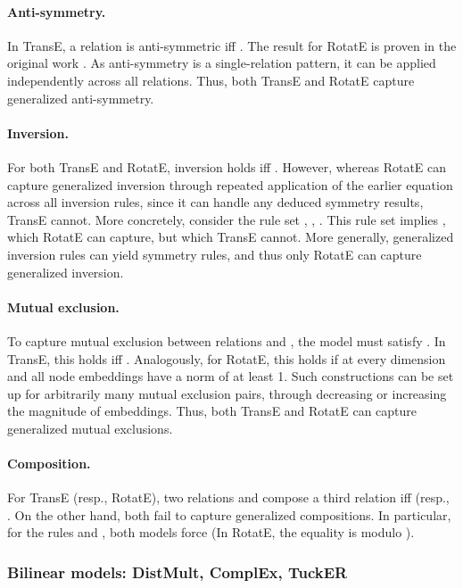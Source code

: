 \documentclass{article}
\begin{document}
\paragraph{Anti-symmetry.} In TransE, a relation  is anti-symmetric iff . The result for RotatE is proven in the original work \cite{RotatE-ICLR19}. As anti-symmetry is a single-relation pattern, it can be applied independently across all relations. Thus, both TransE and RotatE capture generalized anti-symmetry. 

\paragraph{Inversion.} For both TransE and RotatE, inversion holds iff . However, whereas RotatE can capture generalized inversion through repeated application of the earlier equation across all inversion rules, since it can handle any deduced symmetry results, TransE cannot. 
More concretely, consider the rule set , , . This rule set implies , which RotatE can capture, but which TransE cannot. More generally, generalized inversion rules can yield symmetry rules, and thus only RotatE can capture generalized inversion.

\paragraph{Mutual exclusion.}
To capture mutual exclusion between relations  and , the model must satisfy . In TransE, this holds iff  . Analogously, for RotatE, this holds if  at every dimension and all node embeddings have a norm of at least 1. Such constructions can be set up for arbitrarily many mutual exclusion pairs, through decreasing  or increasing the magnitude of embeddings. Thus, both TransE and RotatE can capture generalized mutual exclusions.

\paragraph{Composition.} For TransE (resp., RotatE), two relations  and  compose a third relation  iff   (resp., . On the other hand, both fail to capture generalized compositions. In particular, for the rules  and , both models  force  (In RotatE, the equality is modulo ). 

\subsubsection{Bilinear models: DistMult, ComplEx, TuckER}
\end{document}
